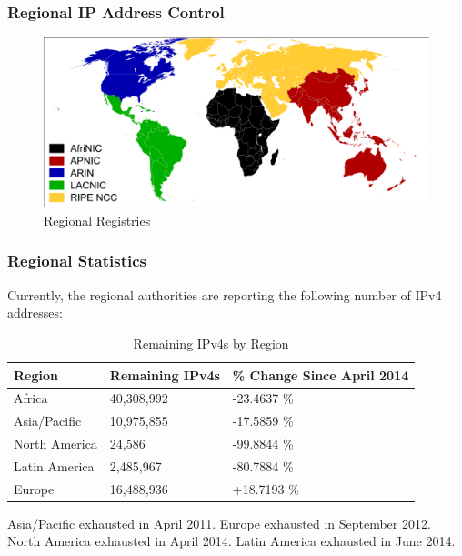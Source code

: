 \documentclass[aspectratio=169]{beamer}
\begin{document}
\begin{frame}
\frametitle{Regional IP Address Control}
\begin{figure}
\includegraphics[scale=0.44]{../artifacts/regional-registries.pdf}
\caption{Regional Registries}
\label{fig:regional}
\end{figure}
\end{frame}

\begin{frame}
\frametitle{Regional Statistics}
Currently, the regional authorities are reporting the following number of IPv4 addresses: \cite{he-stats}
\begin{table}
\begin{tabular}{|l|l|l|}
\hline
\textbf{Region} & \textbf{Remaining IPv4s} & \textbf{\% Change Since April 2014}\\
\hline
Africa & 40,308,992 & -23.4637 \%\\
\hline
Asia/Pacific & 10,975,855 & -17.5859 \%\\
\hline
North America & 24,586 & -99.8844 \%\\
\hline
Latin America & 2,485,967 & -80.7884 \%\\
\hline
Europe & 16,488,936 & +18.7193 \%\\
\hline
\end{tabular}
\caption{Remaining IPv4s by Region}
\label{tbl:remaining}
\end{table}
Asia/Pacific exhausted in April 2011. Europe exhausted in September 2012. North America exhausted in April 2014. \cite{arin} Latin America exhausted in June 2014. \cite{lacnic}
\end{frame}
\end{document}
